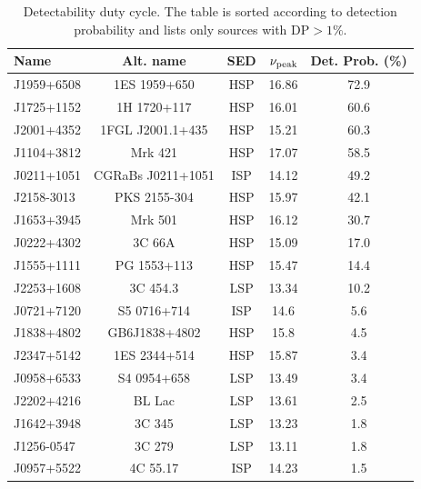 \begin{table}
\caption{Detectability duty cycle. The table is sorted according to detection probability and lists only sources with DP$>1\%$.}
\scriptsize
\begin{tabular}{lcccc}
\toprule
Name & Alt. name  & SED & $\rm \nu_{peak}$ & Det. Prob. (\%) \\
\midrule
J1959+6508 & 1ES 1959+650 & HSP & 16.86 & 72.9 \\
J1725+1152 & 1H 1720+117 & HSP & 16.01 & 60.6 \\
J2001+4352 & 1FGL J2001.1+435 & HSP & 15.21 & 60.3 \\
J1104+3812 & Mrk 421 & HSP & 17.07 & 58.5 \\
J0211+1051 & CGRaBs J0211+1051 & ISP & 14.12 & 49.2 \\
J2158-3013 & PKS 2155-304 & HSP & 15.97 & 42.1 \\
J1653+3945 & Mrk 501 & HSP & 16.12 & 30.7 \\
J0222+4302 & 3C 66A & HSP & 15.09 & 17.0 \\
J1555+1111 & PG 1553+113 & HSP & 15.47 & 14.4 \\
J2253+1608 & 3C 454.3 & LSP & 13.34 & 10.2 \\
J0721+7120 & S5 0716+714 & ISP & 14.6 & 5.6 \\
J1838+4802 & GB6J1838+4802 & HSP & 15.8 & 4.5 \\
J2347+5142 & 1ES 2344+514 & HSP & 15.87 & 3.4 \\
J0958+6533 & S4 0954+658 & LSP & 13.49 & 3.4 \\
J2202+4216 & BL Lac & LSP & 13.61 & 2.5 \\
J1642+3948 & 3C 345 & LSP & 13.23 & 1.8 \\
J1256-0547 & 3C 279 & LSP & 13.11 & 1.8 \\
J0957+5522 & 4C 55.17 & ISP  & 14.23 & 1.5\\
\bottomrule
\end{tabular}
\label{tab:duty_cycle}
\end{table}



